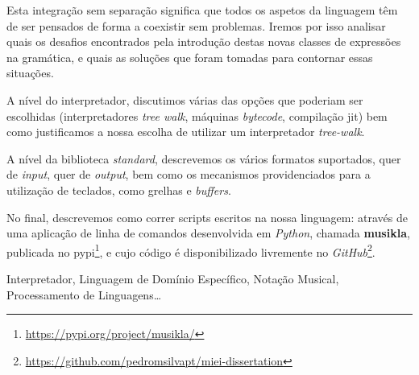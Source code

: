Esta integração sem separação significa que todos os aspetos da linguagem têm de ser pensados de forma a coexistir sem problemas. Iremos por isso analisar quais os desafios encontrados pela introdução destas novas classes de expressões na gramática, e quais as soluções que foram tomadas para contornar essas situações.

A nível do interpretador, discutimos várias das opções que poderiam ser escolhidas (interpretadores \textit{tree walk}, máquinas \textit{bytecode}, compilação \acrshort{jit}) bem como justificamos a nossa escolha de utilizar um interpretador \textit{tree-walk}.

A nível da biblioteca \textit{standard}, descrevemos os vários formatos suportados, quer de \textit{input}, quer de \textit{output}, bem como os mecanismos providenciados para a utilização de teclados, como grelhas e \textit{buffers}.

No final, descrevemos como correr scripts escritos na nossa linguagem: através de uma aplicação de linha de comandos desenvolvida em \textit{Python}, chamada \textbf{musikla}, publicada no \acrfull{pypi}\footnote{\url{https://pypi.org/project/musikla/}}, e cujo código é disponibilizado livremente no \textit{GitHub}\footnote{\url{https://github.com/pedromsilvapt/miei-dissertation}}.




\begin{keywords}
Interpretador, Linguagem de Domínio Específico, Notação Musical, Processamento de Linguagens\ldots
\end{keywords}
